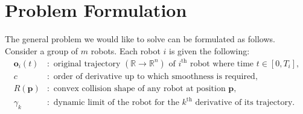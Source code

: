 \documentclass{svproc}
\newcommand{\vp}{\mathbf{p}}
\newcommand{\vo}{\mathbf{o}}
\newcommand{\cO}{\mathcal{O}}
\newcommand{\R}{\mathbb{R}} %
\renewcommand{\th}{^{\text{th}}}
\begin{document}
\section{Problem Formulation} \label{problemFormulation}
The general problem we would like to solve can be formulated as follows. 
Consider a group of $m$ robots. Each robot $i$ is given the following:
\begin{align*}
    \vo_i(t)&:\text{ original trajectory $(\R\to \R^n)$ of $i\th$ robot where time } t\in[0,T_i],\\
    c&:\text{ order of derivative up to which smoothness is required},\\
    R(\vp)&:\text{ convex collision shape of any robot at position $\vp$},\\ %
    \gamma_k&: \text{ dynamic limit of the robot for the $k\th$ derivative of its trajectory}.%
\end{align*}
\end{document}

